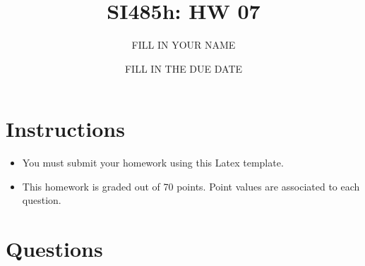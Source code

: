 \documentclass{article}[9pt]
\title{SI485h: HW 07}
\date{FILL IN THE DUE DATE}
\author{FILL IN YOUR NAME}
\begin{document}
\maketitle
\section*{Instructions}

\begin{itemize}
\item You must submit your homework using this Latex template.

\item This homework is graded out of 70 points. Point values are associated to each question.
\end{itemize}

\section*{Questions}
\label{sec:org21d4a36}
\end{document}
